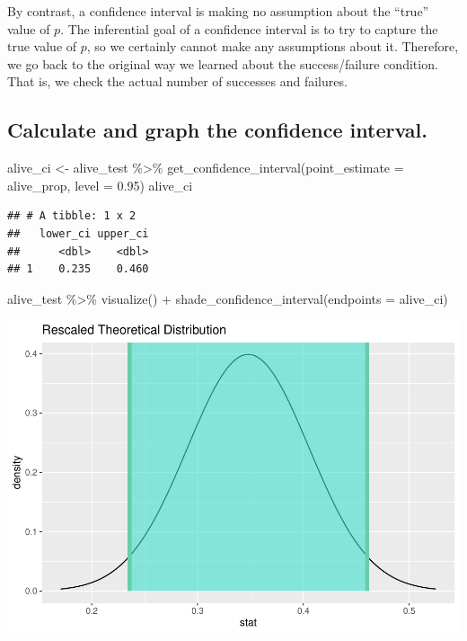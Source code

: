 \documentclass[
]{book}
\newenvironment{Shaded}{\begin{snugshade}}{\end{snugshade}}
\newcommand{\AttributeTok}[1]{\textcolor[rgb]{0.77,0.63,0.00}{#1}}
\newcommand{\FloatTok}[1]{\textcolor[rgb]{0.00,0.00,0.81}{#1}}
\newcommand{\FunctionTok}[1]{\textcolor[rgb]{0.00,0.00,0.00}{#1}}
\newcommand{\NormalTok}[1]{#1}
\newcommand{\OtherTok}[1]{\textcolor[rgb]{0.56,0.35,0.01}{#1}}
\newcommand{\SpecialCharTok}[1]{\textcolor[rgb]{0.00,0.00,0.00}{#1}}
\begin{document}
By contrast, a confidence interval is making no assumption about the ``true'' value of \(p\). The inferential goal of a confidence interval is to try to capture the true value of \(p\), so we certainly cannot make any assumptions about it. Therefore, we go back to the original way we learned about the success/failure condition. That is, we check the actual number of successes and failures.

\hypertarget{one-prop-ex-ci-calculate}{%
\subsection{Calculate and graph the confidence interval.}\label{one-prop-ex-ci-calculate}}

\begin{Shaded}
\begin{Highlighting}[]
\NormalTok{alive\_ci }\OtherTok{\textless{}{-}}\NormalTok{ alive\_test }\SpecialCharTok{\%\textgreater{}\%}
    \FunctionTok{get\_confidence\_interval}\NormalTok{(}\AttributeTok{point\_estimate =}\NormalTok{ alive\_prop, }\AttributeTok{level =} \FloatTok{0.95}\NormalTok{)}
\NormalTok{alive\_ci}
\end{Highlighting}
\end{Shaded}

\begin{verbatim}
## # A tibble: 1 x 2
##   lower_ci upper_ci
##      <dbl>    <dbl>
## 1    0.235    0.460
\end{verbatim}

\begin{Shaded}
\begin{Highlighting}[]
\NormalTok{alive\_test }\SpecialCharTok{\%\textgreater{}\%}
    \FunctionTok{visualize}\NormalTok{() }\SpecialCharTok{+}
    \FunctionTok{shade\_confidence\_interval}\NormalTok{(}\AttributeTok{endpoints =}\NormalTok{ alive\_ci)}
\end{Highlighting}
\end{Shaded}

\includegraphics{intro_stats_files/figure-latex/unnamed-chunk-396-1.pdf}
\end{document}
